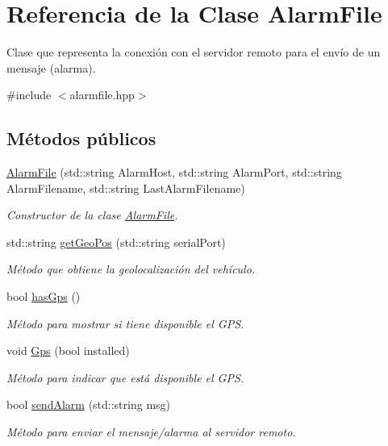 \hypertarget{classAlarmFile}{}\section{Referencia de la Clase Alarm\+File}
\label{classAlarmFile}


Clase que representa la conexión con el servidor remoto para el envío de un mensaje (alarma).  




{\ttfamily \#include $<$alarmfile.\+hpp$>$}

\subsection*{Métodos públicos}
\begin{DoxyCompactItemize}
\item 
\hyperlink{classAlarmFile_ab5b7a78583764cd70d8b5b93a243439d}{Alarm\+File} (std\+::string Alarm\+Host, std\+::string Alarm\+Port, std\+::string Alarm\+Filename, std\+::string Last\+Alarm\+Filename)
\begin{DoxyCompactList}\small\item\em Constructor de la clase \hyperlink{classAlarmFile}{Alarm\+File}. \end{DoxyCompactList}\item 
std\+::string \hyperlink{classAlarmFile_a4865f7e404e938960e45b7e805956401}{get\+Geo\+Pos} (std\+::string serial\+Port)
\begin{DoxyCompactList}\small\item\em Método que obtiene la geolocalización del vehículo. \end{DoxyCompactList}\item 
bool \hyperlink{classAlarmFile_ad75728f6e44f38772372b991f21d9caa}{has\+Gps} ()
\begin{DoxyCompactList}\small\item\em Método para mostrar si tiene disponible el G\+PS. \end{DoxyCompactList}\item 
void \hyperlink{classAlarmFile_acfb3c406818e76439ba47aa539178f7d}{Gps} (bool installed)
\begin{DoxyCompactList}\small\item\em Método para indicar que está disponible el G\+PS. \end{DoxyCompactList}\item 
bool \hyperlink{classAlarmFile_a37fd701cca3c3458a3009b508383947b}{send\+Alarm} (std\+::string msg)
\begin{DoxyCompactList}\small\item\em Método para enviar el mensaje/alarma al servidor remoto. \end{DoxyCompactList}\end{DoxyCompactItemize}


